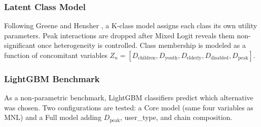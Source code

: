 \subsubsection{Latent Class Model}

Following Greene and Hensher \cite{greene2003}, a K-class model assigns each
class its own utility parameters. Peak interactions are dropped after Mixed
Logit reveals them non-significant once heterogeneity is controlled. Class
membership is modeled as a function of concomitant variables
$Z_n = [D_{\mathrm{children}}, D_{\mathrm{youth}}, D_{\mathrm{elderly}},
D_{\mathrm{disabled}}, D_{\mathrm{peak}}]$.

\subsubsection{LightGBM Benchmark}

As a non-parametric benchmark, LightGBM \cite{ke2017} classifiers predict
which alternative was chosen. Two configurations are tested: a Core model
(same four variables as MNL) and a Full model adding $D_{\mathrm{peak}}$,
user\_type, and chain composition.
